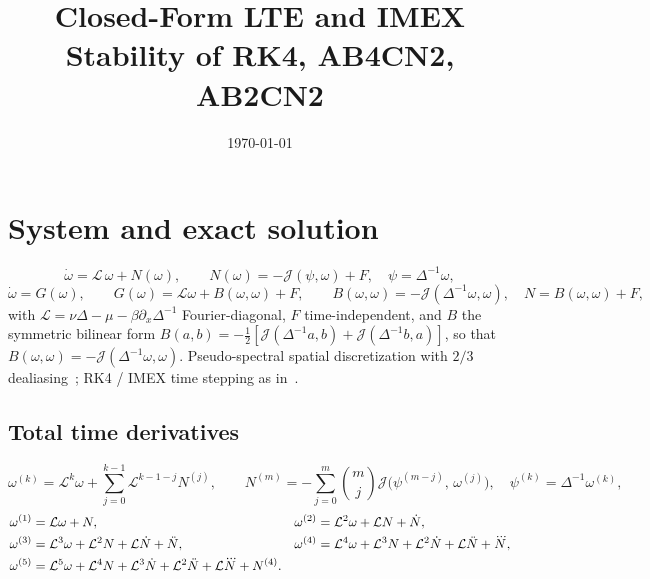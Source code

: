 \documentclass[11pt]{article}
\title{\bfseries Closed-Form LTE and IMEX Stability of RK4, AB4CN2, AB2CN2}
\author{}
\date{\today}
\newcommand{\Lop}{\mathcal{L}}
\newcommand{\Jop}{\mathcal{J}}
\newcommand{\Ndot}{\dot{N}}
\newcommand{\Nddot}{\ddot{N}}
\newcommand{\Ndddot}{\dddot{N}}
\begin{document}
\maketitle

\section{System and exact solution}

\begin{equation}
  \dot\omega = \Lop\,\omega + N(\omega), \qquad
  N(\omega) = -\Jop(\psi,\omega)+F, \quad \psi=\Delta^{-1}\omega,
  \label{eq:qg}
\end{equation}
\begin{equation}
  \dot\omega = G(\omega), \qquad
  G(\omega) = \Lop\omega + B(\omega,\omega) + F, \qquad
  B(\omega,\omega)=-\Jop(\Delta^{-1}\omega,\omega),\quad N=B(\omega,\omega)+F,
  \label{eq:ode}
\end{equation}
with $\Lop=\nu\Delta-\mu-\beta\partial_x\Delta^{-1}$ Fourier-diagonal, $F$ time-independent,
and $B$ the symmetric bilinear form $B(a,b)=-\tfrac12[\Jop(\Delta^{-1}a,b)+\Jop(\Delta^{-1}b,a)]$,
so that $B(\omega,\omega)=-\Jop(\Delta^{-1}\omega,\omega)$. Pseudo-spectral spatial discretization
with $2/3$ dealiasing~\cite{canuto2006,boyd2001,vallis2017}; RK4 / IMEX time stepping as
in~\cite{hairer1993,butcher2016,ascher1995,burns2020}.

\subsection{Total time derivatives}

\begin{equation}
  \omega^{(k)} = \Lop^k\omega + \sum_{j=0}^{k-1}\Lop^{k-1-j}N^{(j)},
  \qquad
  N^{(m)} = -\sum_{j=0}^{m}\binom{m}{j}\Jop\!\bigl(\psi^{(m-j)},\,\omega^{(j)}\bigr),
  \quad \psi^{(k)}=\Delta^{-1}\omega^{(k)},
  \label{eq:wk}
\end{equation}
\begin{align}
  \omega^{(1)} &= \Lop\omega + N, &
  \omega^{(2)} &= \Lop^2\omega + \Lop N + \Ndot, \notag\\
  \omega^{(3)} &= \Lop^3\omega + \Lop^2 N + \Lop\Ndot + \Nddot, &
  \omega^{(4)} &= \Lop^4\omega + \Lop^3 N + \Lop^2\Ndot + \Lop\Nddot + \Ndddot, \notag\\
  \omega^{(5)} &= \Lop^5\omega + \Lop^4 N + \Lop^3\Ndot + \Lop^2\Nddot + \Lop\Ndddot + N^{(4)}.
  \label{eq:w5}
\end{align}
\end{document}

